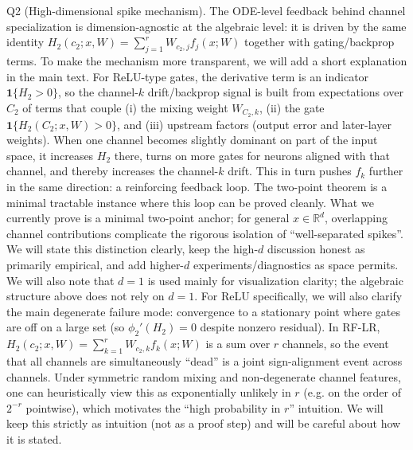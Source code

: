 Q2 (High-dimensional spike mechanism). The ODE-level feedback behind channel specialization is dimension-agnostic at the algebraic level: it is driven by the same identity $H_2(c_2;x,W)=\sum_{j=1}^r W_{c_2,j} f_j(x;W)$ together with gating/backprop terms.
To make the mechanism more transparent, we will add a short explanation in the main text. For ReLU-type gates, the derivative term is an indicator $\mathbf 1\{H_2>0\}$, so the channel-$k$ drift/backprop signal is built from expectations over $C_2$ of terms that couple (i) the mixing weight $W_{C_2,k}$, (ii) the gate $\mathbf 1\{H_2(C_2;x,W)>0\}$, and (iii) upstream factors (output error and later-layer weights). When one channel becomes slightly dominant on part of the input space, it increases $H_2$ there, turns on more gates for neurons aligned with that channel, and thereby increases the channel-$k$ drift. This in turn pushes $f_k$ further in the same direction: a reinforcing feedback loop. The two-point theorem is a minimal tractable instance where this loop can be proved cleanly.
What we currently prove is a minimal two-point anchor; for general $x\in\mathbb R^d$, overlapping channel contributions complicate the rigorous isolation of “well-separated spikes”. We will state this distinction clearly, keep the high-$d$ discussion honest as primarily empirical, and add higher-$d$ experiments/diagnostics as space permits. We will also note that $d=1$ is used mainly for visualization clarity; the algebraic structure above does not rely on $d=1$.
For ReLU specifically, we will also clarify the main degenerate failure mode: convergence to a stationary point where gates are off on a large set (so $\phi_2'(H_2)=0$ despite nonzero residual). In RF-LR, $H_2(c_2;x,W)=\sum_{k=1}^r W_{c_2,k} f_k(x;W)$ is a sum over $r$ channels, so the event that all channels are simultaneously “dead” is a joint sign-alignment event across channels. Under symmetric random mixing and non-degenerate channel features, one can heuristically view this as exponentially unlikely in $r$ (e.g. on the order of $2^{-r}$ pointwise), which motivates the “high probability in $r$” intuition. We will keep this strictly as intuition (not as a proof step) and will be careful about how it is stated.

